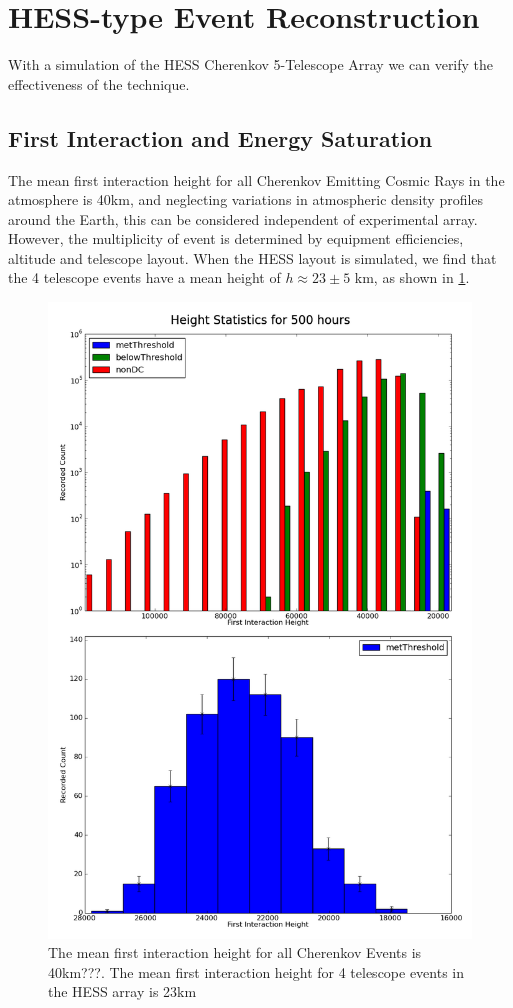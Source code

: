 \documentclass{article}
\begin{document}
\section{HESS-type Event Reconstruction}
With a simulation of the HESS Cherenkov 5-Telescope Array we can verify the effectiveness of the technique. 
\subsection{First Interaction and Energy Saturation}
The mean first interaction height for all Cherenkov Emitting Cosmic Rays in the atmosphere is 40km, and neglecting variations in atmospheric density profiles around the Earth, this can be considered independent of experimental array. However, the multiplicity of event is determined by equipment efficiencies, altitude and telescope layout. When the HESS layout is simulated, we find that the 4 telescope events have a mean height of $h \approx 23 \pm 5$ km, as shown in \ref{fig:Hessheight}.

\begin{figure}
\begin{center}
\includegraphics[height=0.9\textheight]{hessheight}
\caption{The mean first interaction height for all Cherenkov Events is 40km???. The mean first interaction height for 4 telescope events in the HESS array is 23km}
\label{fig:Hessheight}
\end{center}
\end{figure}
\end{document}
